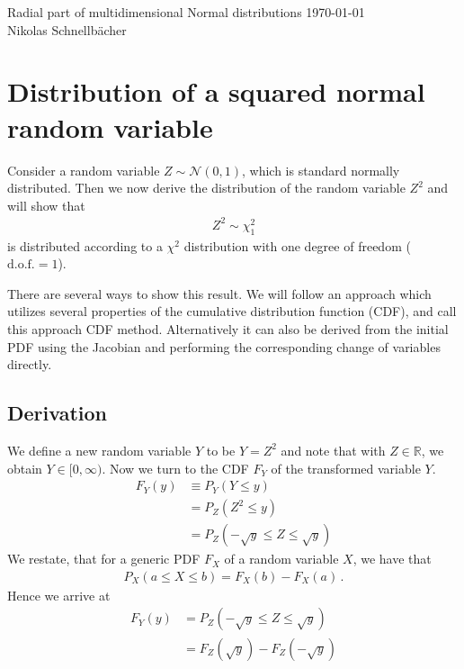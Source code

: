 \documentclass[11pt, DINA4, fleqn]{amsart}
\begin{document}

\tikzset{node distance = 2cm, auto}

\begin{flushleft}
{\sc \Large Radial part of multidimensional Normal distributions} \hfill \today \\
\medskip
Nikolas Schnellbächer \underline{\hspace{6.53in}} \\
\end{flushleft}

\section*{Distribution of a squared normal random variable}
Consider a random variable $Z\sim \mathcal{N}(0,1)$, which is standard normally distributed. Then we now derive the distribution of the random variable $Z^2$ and will show that
\begin{align}
Z^2 \sim \chi_1^{2}
\end{align}
is distributed according to a $\chi^2$ distribution with one degree of freedom ($\text{d.o.f.} = 1$).

There are several ways to show this result. We will follow an approach which utilizes several properties of the cumulative distribution function (CDF), and call this approach CDF method. Alternatively it can also be derived from the initial PDF using the Jacobian and performing the corresponding change of variables directly.

\subsection*{Derivation}
We define a new random variable $Y$ to be $Y = Z^2$ and note that with
$Z\in\mathds{R}$, we obtain $Y\in[0,\infty)$. Now we turn to the CDF $F_Y$ of the transformed variable $Y$.
\begin{align}
F_{Y}(y) &\equiv P_Y(Y \le y) \\
&= P_Z(Z^2 \le y) \\
&= P_Z(-\sqrt{y} \le Z \le \sqrt{y})
\end{align}
We restate, that for a generic PDF $F_X$ of a random variable $X$, we have that
\begin{align}
P_X(a\le X \le b) = F_X(b) - F_X(a) \, .
\end{align}
Hence we arrive at
\begin{align}
F_Y(y) &=  P_Z(-\sqrt{y} \le Z \le \sqrt{y}) \\
&= F_Z(\sqrt{y}) - F_Z(-\sqrt{y})
\end{align}
\end{document}
